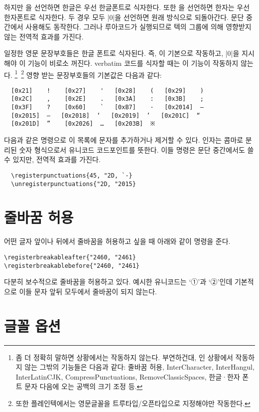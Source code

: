 \documentclass[a4paper]{article}
\def\luatex{\hologo{LuaTeX}}
\def\logoko{\textsf{k}\kern-.0625em\textit{o}}
\def\luatexko{\luatex-\logoko}
\begin{document}
하지만 을 선언하면 한글은 우선 한글폰트로
식자한다. 또한 을 선언하면 한자는 우선 한자폰트로
식자한다. 두 경우 모두 |0|을 선언하면 원래 방식으로 되돌아간다.
문단 중간에서 사용해도 동작한다. 그러나 루아코드가 실행되므로
텍의 그룹에 의해 영향받지 않는 전역적 효과를 가진다.

일정한 영문 문장부호들은 한글 폰트로 식자된다.
즉, 이 기본으로 작동하고,
|0|을 지시해야 이 기능이 비로소 꺼진다.
verbatim 코드를 식자할 때는 이 기능이 작동하지 않는다.%
\footnote{%
  좀 더 정확히 말하면  상황에서는 작동하지 않는다.
  부연하건대, 인 상황에서 작동하지 않는 그밖의 기능들은
  다음과 같다: 줄바꿈 허용, InterCharacter, InterHangul, InterLatinCJK,
  CompressPunctuations, RemoveClassicSpaces,
  한글^^b7한자 폰트 문자 다음에 오는 공백의 크기 조정 등. }\,%
\footnote{%
  또한 플레인텍에서는 영문글꼴을 트루타입/오픈타입으로 지정해야만 작동한다. }
영향 받는 문장부호들의 기본값은 다음과 같다:
\begin{verbatim}
  [0x21]    !    [0x27]    '   [0x28]    (   [0x29]    )
  [0x2C]    ,    [0x2E]    .   [0x3A]    :   [0x3B]    ;
  [0x3F]    ?    [0x60]    `   [0xB7]    ·   [0x2014]  —
  [0x2015]  ―   [0x2018]  ‘   [0x2019]  ’   [0x201C]  “
  [0x201D]  ”    [0x2026]  …   [0x203B]  ※
\end{verbatim}

다음과 같은 명령으로 이 목록에 문자를 추가하거나 제거할 수 있다.
인자는 콤마로 분리된 숫자 형식으로서 유니코드 코드포인트를 뜻한다.
이들 명령은 문단 중간에서도 쓸 수 있지만, 전역적 효과를 가진다.
\begin{verbatim}
  \registerpunctuations{45, "2D, `-}
  \unregisterpunctuations{"2D, "2015}
\end{verbatim}

\section{줄바꿈 허용}\label{sec:break}

어떤 글자 앞이나 뒤에서 줄바꿈을 허용하고 싶을 때 아래와 같이 명령을 준다.
\begin{verbatim}
\registerbreakableafter{"2460, "2461}
\registerbreakablebefore{"2460, "2461}
\end{verbatim}
 다분히 보수적으로 줄바꿈을 허용하고 있다.
예시한 유니코드는 `①'과 `②'인데 기본적으로
이들 문자 앞뒤 모두에서 줄바꿈이 되지 않는다.

\section{글꼴 옵션}\label{sec:fontoption}
\end{document}
